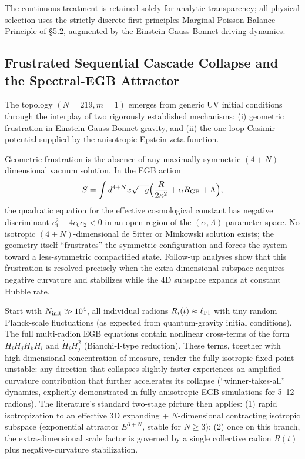 \documentclass[12pt,a4paper]{article}
\begin{document}
The continuous treatment is retained solely for analytic transparency; all physical selection uses the strictly discrete first-principles Marginal Poisson-Balance Principle of §5.2, augmented by the Einstein-Gauss-Bonnet driving dynamics.

\subsection{Frustrated Sequential Cascade Collapse and the Spectral-EGB Attractor}
The topology \((N=219,m=1)\) emerges from generic UV initial conditions through the interplay of two rigorously established mechanisms: (i) geometric frustration in Einstein-Gauss-Bonnet gravity, and (ii) the one-loop Casimir potential supplied by the anisotropic Epstein zeta function.

Geometric frustration is the absence of any maximally symmetric \((4+N)\)-dimensional vacuum solution. In the EGB action
\[
S = \int d^{4+N}x\sqrt{-g}\Bigl(\frac{R}{2\kappa^2} + \alpha R_{\rm GB} + \Lambda\Bigr),
\]
the quadratic equation for the effective cosmological constant has negative discriminant \(c_1^2 - 4c_0 c_2 < 0\) in an open region of the \((\alpha,\Lambda)\) parameter space. No isotropic \((4+N)\)-dimensional de Sitter or Minkowski solution exists; the geometry itself “frustrates” the symmetric configuration and forces the system toward a less-symmetric compactified state. Follow-up analyses show that this frustration is resolved precisely when the extra-dimensional subspace acquires negative curvature and stabilizes while the 4D subspace expands at constant Hubble rate.

Start with \(N_{\rm init}\gg 10^4\), all individual radions \(R_i(t)\approx\ell_{\rm Pl}\) with tiny random Planck-scale fluctuations (as expected from quantum-gravity initial conditions). The full multi-radion EGB equations contain nonlinear cross-terms of the form \(H_i H_j H_k H_l\) and \(\dot{H}_i H_j^2\) (Bianchi-I-type reduction). These terms, together with high-dimensional concentration of measure, render the fully isotropic fixed point unstable: any direction that collapses slightly faster experiences an amplified curvature contribution that further accelerates its collapse (“winner-takes-all” dynamics, explicitly demonstrated in fully anisotropic EGB simulations for 5--12 radions). The literature’s standard two-stage picture then applies: (1) rapid isotropization to an effective 3D expanding + \(N\)-dimensional contracting isotropic subspace (exponential attractor \(E^{3+N}\), stable for \(N\geq 3\)); (2) once on this branch, the extra-dimensional scale factor is governed by a single collective radion \(R(t)\) plus negative-curvature stabilization.
\end{document}
